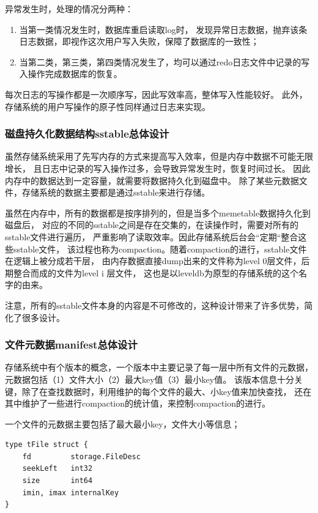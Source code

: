 	异常发生时，处理的情况分两种：
		\begin{enumerate}
			\item 当第一类情况发生时，数据库重启读取log时，
			发现异常日志数据，抛弃该条日志数据，即视作这次用户写入失败，保障了数据库的一致性；
			\item 当第二类，第三类，第四类情况发生了，均可以通过redo日志文件中记录的写入操作完成数据库的恢复。
		\end{enumerate}
		每次日志的写操作都是一次顺序写，因此写效率高，整体写入性能较好。
		此外，存储系统的用户写操作的原子性同样通过日志来实现。

		\subsubsection{磁盘持久化数据结构sstable总体设计}

		虽然存储系统采用了先写内存的方式来提高写入效率，但是内存中数据不可能无限增长，
		且日志中记录的写入操作过多，会导致异常发生时，恢复时间过长。
		因此内存中的数据达到一定容量，就需要将数据持久化到磁盘中。
		除了某些元数据文件，存储系统的数据主要都是通过sstable来进行存储。

		虽然在内存中，所有的数据都是按序排列的，但是当多个memetable数据持久化到磁盘后，
		对应的不同的sstable之间是存在交集的，在读操作时，需要对所有的sstable文件进行遍历，
		严重影响了读取效率。因此存储系统后台会“定期“整合这些sstable文件，
		该过程也称为compaction。随着compaction的进行，sstable文件在逻辑上被分成若干层，
		由内存数据直接dump出来的文件称为level 0层文件，后期整合而成的文件为level i 层文件，
		这也是以leveldb为原型的存储系统的这个名字的由来。

		注意，所有的sstable文件本身的内容是不可修改的，这种设计带来了许多优势，简化了很多设计。

		\subsubsection{文件元数据manifest总体设计}

		存储系统中有个版本的概念，一个版本中主要记录了每一层中所有文件的元数据，
		元数据包括（1）文件大小（2）最大key值（3）最小key值。
		该版本信息十分关键，除了在查找数据时，利用维护的每个文件的最大、小key值来加快查找，
		还在其中维护了一些进行compaction的统计值，来控制compaction的进行。

		一个文件的元数据主要包括了最大最小key，文件大小等信息；
		
		\begin{lstlisting}[caption=tFile , label=code_radds_storage_tfile]
type tFile struct {
    fd         storage.FileDesc
	seekLeft   int32
    size       int64
    imin, imax internalKey
}
		\end{lstlisting}

